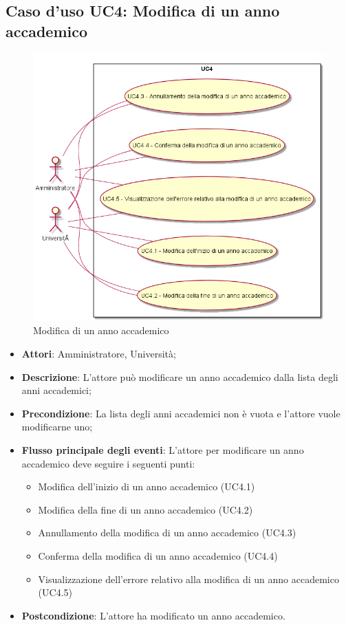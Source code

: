 \subsection{Caso d'uso \texorpdfstring{UC4}{UC4}: Modifica di un anno accademico}
\begin{figure} [H]
\centering
\includegraphics[scale=0.45]{./img/UC4.png}
\caption{Modifica di un anno accademico}\label{}
\end{figure}
\begin{itemize}
\item \textbf{Attori}: Amministratore, Università;
\item \textbf{Descrizione}: L'attore può modificare un anno accademico dalla lista degli anni accademici;
\item \textbf{Precondizione}: La lista degli anni accademici non è vuota e l'attore vuole modificarne uno;
\item \textbf{Flusso principale degli eventi}: L'attore per modificare un anno accademico deve seguire i seguenti punti:
\begin{itemize}
\item Modifica dell'inizio di un anno accademico (UC4.1)
\item Modifica della fine di un anno accademico (UC4.2)
\item Annullamento della modifica di un anno accademico (UC4.3)
\item Conferma della modifica di un anno accademico (UC4.4)
\item Visualizzazione dell'errore relativo alla modifica di un anno accademico (UC4.5)
\end{itemize}
\item \textbf{Postcondizione}: L'attore ha modificato un anno accademico.
\end{itemize}
